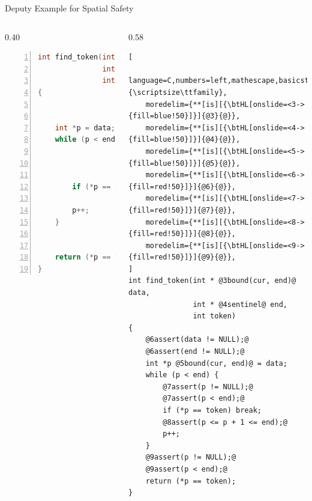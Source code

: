 \documentclass[aspectratio=169]{beamer}
\begin{document}
\begin{frame}[fragile]{Deputy Example for Spatial Safety}
\begin{columns}[T]
\begin{column}{0.40\textwidth}
\begin{lstlisting}[language=C,numbers=left,mathescape,basicstyle={\scriptsize\ttfamily}]
int find_token(int *data,
               int *end,
               int token)
{


    int *p = data;
    while (p < end) {



        if (*p == token) break;

        p++;
    }


    return (*p == token);
}
\end{lstlisting}
\end{column}


\pause

\begin{column}{0.58\textwidth}
\begin{lstlisting}[
    language=C,numbers=left,mathescape,basicstyle={\scriptsize\ttfamily},
    moredelim={**[is][{\btHL[onslide=<3->{fill=blue!50}]}]{@3}{@}},
    moredelim={**[is][{\btHL[onslide=<4->{fill=blue!50}]}]{@4}{@}},
    moredelim={**[is][{\btHL[onslide=<5->{fill=blue!50}]}]{@5}{@}},
    moredelim={**[is][{\btHL[onslide=<6->{fill=red!50}]}]{@6}{@}},
    moredelim={**[is][{\btHL[onslide=<7->{fill=red!50}]}]{@7}{@}},
    moredelim={**[is][{\btHL[onslide=<8->{fill=red!50}]}]{@8}{@}},
    moredelim={**[is][{\btHL[onslide=<9->{fill=red!50}]}]{@9}{@}},
]
int find_token(int * @3bound(cur, end)@ data,
               int * @4sentinel@ end,
               int token)
{
    @6assert(data != NULL);@
    @6assert(end != NULL);@
    int *p @5bound(cur, end)@ = data;
    while (p < end) {
        @7assert(p != NULL);@
        @7assert(p < end);@
        if (*p == token) break;
        @8assert(p <= p + 1 <= end);@
        p++;
    }
    @9assert(p != NULL);@
    @9assert(p < end);@
    return (*p == token);
}
\end{lstlisting}
\end{column}

\end{columns}
\end{frame}
\end{document}
